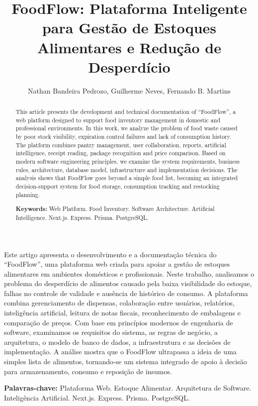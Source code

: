 \documentclass[12pt]{article}
\title{FoodFlow: Plataforma Inteligente para Gestão de Estoques Alimentares e Redução de Desperdício}
\author{Nathan Bandeira Pedrozo\inst{1}, Guilherme Neves\inst{1}, Fernando B. Martins\inst{1}}
\begin{document}
\maketitle

\begin{abstract}
This article presents the development and technical documentation of ``FoodFlow'', a web platform designed to support food inventory management in domestic and professional environments. In this work, we analyze the problem of food waste caused by poor stock visibility, expiration control failures and lack of consumption history. The platform combines pantry management, user collaboration, reports, artificial intelligence, receipt reading, package recognition and price comparison. Based on modern software engineering principles, we examine the system requirements, business rules, architecture, database model, infrastructure and implementation decisions. The analysis shows that FoodFlow goes beyond a simple food list, becoming an integrated decision-support system for food storage, consumption tracking and restocking planning.

\textbf{Keywords:} Web Platform. Food Inventory. Software Architecture. Artificial Intelligence. Next.js. Express. Prisma. PostgreSQL.
\end{abstract}

\begin{resumo}
Este artigo apresenta o desenvolvimento e a documentação técnica do ``FoodFlow'', uma plataforma web criada para apoiar a gestão de estoques alimentares em ambientes domésticos e profissionais. Neste trabalho, analisamos o problema do desperdício de alimentos causado pela baixa visibilidade do estoque, falhas no controle de validade e ausência de histórico de consumo. A plataforma combina gerenciamento de dispensas, colaboração entre usuários, relatórios, inteligência artificial, leitura de notas fiscais, reconhecimento de embalagens e comparação de preços. Com base em princípios modernos de engenharia de software, examinamos os requisitos do sistema, as regras de negócio, a arquitetura, o modelo de banco de dados, a infraestrutura e as decisões de implementação. A análise mostra que o FoodFlow ultrapassa a ideia de uma simples lista de alimentos, tornando-se um sistema integrado de apoio à decisão para armazenamento, consumo e reposição de insumos.

\textbf{Palavras-chave:} Plataforma Web. Estoque Alimentar. Arquitetura de Software. Inteligência Artificial. Next.js. Express. Prisma. PostgreSQL.
\end{resumo}
\end{document}
